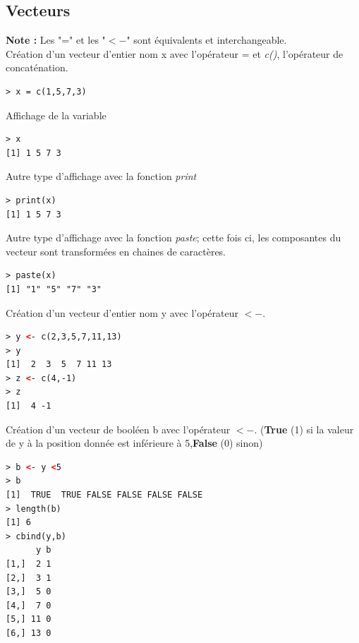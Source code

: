 \subsection{Vecteurs}
\textbf{Note :} Les "=" et les "$<-$" sont équivalents et interchangeable.\newline
\\
Création d'un vecteur d'entier nom x avec l'opérateur = et \textit{c()}, l'opérateur de concaténation.
\begin{lstlisting}[language=html]
> x = c(1,5,7,3)
\end{lstlisting}
Affichage de la variable
\begin{lstlisting}[language=html]
> x
[1] 1 5 7 3
\end{lstlisting}
Autre type d'affichage avec la fonction \textit{print} 
\begin{lstlisting}[language=html]
> print(x)
[1] 1 5 7 3
\end{lstlisting}
Autre type d'affichage avec la fonction \textit{paste}; cette fois ci, les composantes du vecteur sont transformées en chaines de caractères.
\begin{lstlisting}[language=html]
> paste(x)
[1] "1" "5" "7" "3" 
\end{lstlisting}
Création d'un vecteur d'entier nom y avec l'opérateur $<-$.
\begin{lstlisting}[language=html]
> y <- c(2,3,5,7,11,13)
> y
[1]  2  3  5  7 11 13
> z <- c(4,-1)
> z
[1]  4 -1
\end{lstlisting}
Création d'un vecteur de booléen b avec l'opérateur $<-$. (\textbf{True} (1) si la valeur de y à la position donnée est inférieure à 5,\textbf{False} (0) sinon)
\begin{lstlisting}[language=html]
> b <- y <5
> b
[1]  TRUE  TRUE FALSE FALSE FALSE FALSE
> length(b)
[1] 6
> cbind(y,b)
      y b
[1,]  2 1
[2,]  3 1
[3,]  5 0
[4,]  7 0
[5,] 11 0
[6,] 13 0
\end{lstlisting}
